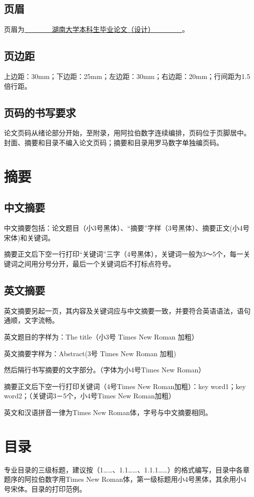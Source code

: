 \subsection{页眉}
页眉为\uline{~~~~~~~~湖南大学本科生毕业论文（设计）~~~~~~~~}。

\subsection{页边距}
上边距：30mm；下边距：25mm；左边距：30mm；右边距：20mm；行间距为1.5倍行距。

\subsection{页码的书写要求}
论文页码从绪论部分开始，至附录，用阿拉伯数字连续编排，页码位于页脚居中。封面、摘要和目录不编入论文页码；摘要和目录用罗马数字单独编页码。

\section{摘要}
\subsection{中文摘要}
中文摘要包括：论文题目（小3号黑体）、“摘要”字样（3号黑体）、摘要正文(小4号宋体)和关键词。

摘要正文后下空一行打印“关键词”三字（4号黑体），关键词一般为3～5个，每一关键词之间用分号分开，最后一个关键词后不打标点符号。

\subsection{英文摘要}
英文摘要另起一页，其内容及关键词应与中文摘要一致，并要符合英语语法，语句通顺，文字流畅。

英文题目的字样为：The title（小3号 Times New Roman 加粗）

英文摘要字样为：Abstract(3号 Times New Roman 加粗)

然后隔行书写摘要的文字部分。（字体为小4号Times New Roman）

摘要正文后下空一行打印关键词（4号Times New Roman加粗）：key word1；key word2；（关键词3－5个，小4号Times New Roman加粗）

英文和汉语拼音一律为Times New Roman体，字号与中文摘要相同。

\section{目录}
专业目录的三级标题，建议按（1……、1.1……、1.1.1……）的格式编写，目录中各章题序的阿拉伯数字用Times New Roman体，第一级标题用小4号黑体，其余用小4号宋体。目录的打印范例。

